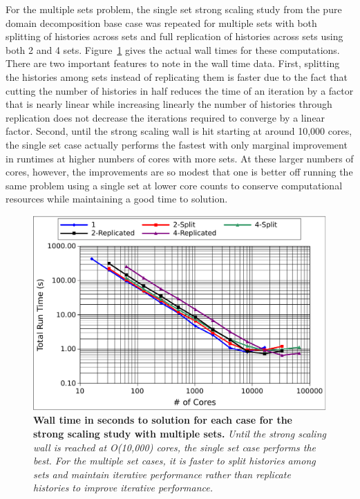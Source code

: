 For the multiple sets problem, the single set strong scaling study
from the pure domain decomposition base case was repeated for multiple
sets with both splitting of histories across sets and full replication
of histories across sets using both 2 and 4
sets. Figure~\ref{fig:titan_strong_ms_time} gives the actual wall
times for these computations. There are two important features to note
in the wall time data. First, splitting the histories among sets
instead of replicating them is faster due to the fact that cutting the
number of histories in half reduces the time of an iteration by a
factor that is nearly linear while increasing linearly the number of
histories through replication does not decrease the iterations
required to converge by a linear factor. Second, until the strong
scaling wall is hit starting at around 10,000 cores, the single set
case actually performs the fastest with only marginal improvement in
runtimes at higher numbers of cores with more sets. At these larger
numbers of cores, however, the improvements are so modest that one is
better off running the same problem using a single set at lower core
counts to conserve computational resources while maintaining a good
time to solution.

\begin{figure}[t!]
  \begin{center}
    \includegraphics[width=6in]{chapters/parallel_mc/titan_strong_ms_time.pdf}
  \end{center}
  \caption{\textbf{Wall time in seconds to solution for each case for
      the strong scaling study with multiple sets.} \textit{Until the
      strong scaling wall is reached at O(10,000) cores, the single
      set case performs the best. For the multiple set cases, it is
      faster to split histories among sets and maintain iterative
      performance rather than replicate histories to improve iterative
      performance.}}
  \label{fig:titan_strong_ms_time}
\end{figure}

